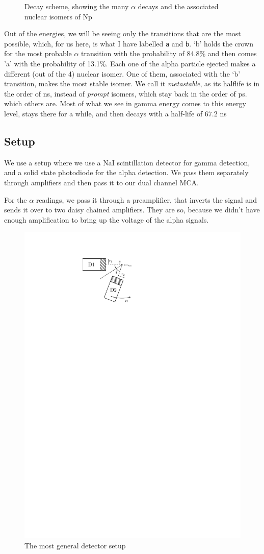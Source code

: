 \documentclass{double}
\begin{document}
\begin{multicols*}{2}
\begin{figure}[H]
	\caption{Decay scheme, showing the many $\alpha$ decays
    and the associated nuclear isomers of Np}
    \label{decay}
\end{figure}
Out of the energies, we will be seeing only the transitions
that are the most possible, which, for us here, is what I
have labelled \texttt{a} and \texttt{b}. `b' holds the crown
for the most probable $\alpha$ transition with the
probability of 84.8\% and then comes 'a' with the
probability of 13.1\%. Each one of the alpha particle
ejected makes a different (out of the 4) nuclear isomer. One
of them, associated with the `b' transition, makes the most
stable isomer. We call it \emph{metastable}, as its halflife is in
the order of ns, instead of \emph{prompt} isomers, which
stay back in the order of ps. which others are. Most of what
we see in gamma energy comes to this energy level, stays
there for a while, and then decays with a half-life of
$67.2$ ns

\subsection{Setup}
We use a setup where we use a NaI scintillation detector for
gamma detection, and a solid state photodiode for the alpha
detection. We pass them separately through amplifiers and
then pass it to our dual channel MCA.

For the $\alpha$ readings, we pass it through a
preamplifier, that inverts the signal and sends it over to
two daisy chained amplifiers. They are so, because we didn't
have enough amplification to bring up the voltage of the
alpha signals. 

\begin{figure}[H]
    \centering
    \includegraphics[width=0.6\columnwidth]{images/detectors.pdf}
    \caption{The most general detector setup}
    \label{detect}
\end{figure}


\end{multicols*}
\end{document}
